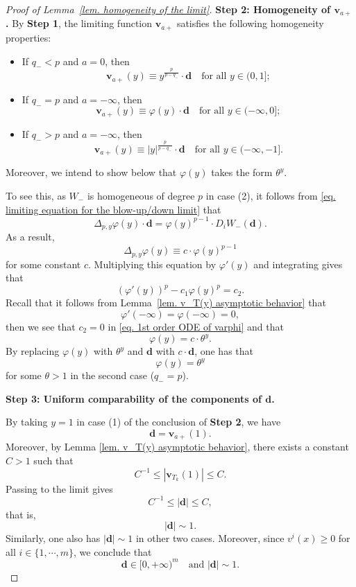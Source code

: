 \documentclass[11pt,twoside,reqno]{amsart}
\numberwithin{equation}{section}
\begin{document}
\begin{proof}[Proof of Lemma~\ref{lem. homogeneity of the limit}]
\textbf{Step 2: Homogeneity of $\mathbf{v}_{a+}$.} 
By \textbf{Step 1}, the limiting function $\mathbf v_{a+}$ satisfies the following
homogeneity properties:
\begin{itemize}
    \item[(1)] If $q_{-}<p$ and $a=0$, then
    \begin{equation*}
        \mathbf{v}_{a+}(y)\equiv y^{\frac{p}{p-q_{-}}}\cdot\mathbf{d}\quad\mbox{for all }y\in(0,1];
    \end{equation*}
    \item[(2)] If  $q_{-}=p$ and $a=-\infty$, then
    \begin{equation*}
        \mathbf{v}_{a+}(y)\equiv\varphi(y)\cdot\mathbf{d}\quad\mbox{for all }y\in(-\infty,0];
    \end{equation*}
    \item[(3)] If $q_{-}>p$ and $a=-\infty$, then
    \begin{equation*}
        \mathbf{v}_{a+}(y)\equiv|y|^{\frac{p}{p-q_{-}}}\cdot\mathbf{d}\quad\mbox{for all }y\in(-\infty,-1].
    \end{equation*}
\end{itemize}
Moreover, we intend to show below that $\varphi(y)$ takes the form $\theta^{y}$.

To see this, as $W_{-}$ is homogeneous of degree $p$ in case (2), it follows from \eqref{eq. limiting equation for the blow-up/down limit} that
\begin{equation*}
    \Delta_{p,y}\varphi(y)\cdot\mathbf{d}=\varphi(y)^{p-1}\cdot D_{i}W_{-}(\mathbf{d}).
\end{equation*}
As a result, $$\Delta_{p,y}\varphi(y)\equiv c\cdot\varphi(y)^{p-1}$$ for some constant $c$. Multiplying this equation by $\varphi'(y)$  and  integrating gives that
\begin{equation}\label{eq. 1st order ODE of varphi}
    (\varphi'(y))^{p}-c_{1}\varphi(y)^{p}=c_{2}.
\end{equation}
Recall that it follows from Lemma~\ref{lem. v_T(y) asymptotic behavior} that $$\varphi'(-\infty)=\varphi(-\infty)=0,$$ then we see that $c_{2}=0$ in \eqref{eq. 1st order ODE of varphi} and that $$\varphi(y)=c\cdot\theta^{y}.$$ By replacing $\varphi(y)$ with $\theta^{y}$ and $\mathbf{d}$ with $c\cdot\mathbf{d}$, one has that $$\varphi(y)=\theta^{y}$$ for some $\theta>1$ in the second case ($q_{-}=p$).

\textbf{Step 3: Uniform comparability of the components of $\mathbf{d}$.} 

By taking $y=1$ in case (1) of the conclusion of \textbf{Step 2}, we have $$\mathbf{d}=\mathbf{v}_{a+}(1).$$ Moreover, by Lemma \ref{lem. v_T(y) asymptotic behavior}, there exists a constant $C>1$ such that $$C^{-1}\leq |\mathbf{v}_{T_k}(1)|\leq C.$$ Passing to the limit gives $$C^{-1}\leq|\mathbf{d}|\leq C,$$ that is, $$|\mathbf{d}|\sim1.$$ Similarly, one also has $|\mathbf{d}|\sim1$ in other two cases. Moreover, since $v^{i}(x)\geq0$ for all $i\in\{1,\cdots,m\}$, we conclude that
\begin{equation*}
    \mathbf{d}\in[0,+\infty)^{m}\quad\mbox{and }|\mathbf{d}|\sim1.
\end{equation*}


\end{proof}
\end{document}
